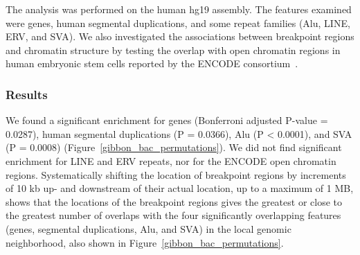 The analysis was performed on the human hg19 assembly. The features examined were genes, human segmental duplications, and some repeat families (Alu, LINE, ERV, and SVA). We also investigated the associations between breakpoint regions and chromatin structure by testing the overlap with open chromatin regions in human embryonic stem cells reported by the ENCODE consortium~\cite{ENCODEProjectConsortium:2011iz}. 

\subsubsection{Results}

We found a significant enrichment for genes (Bonferroni adjusted P-value = 0.0287), human segmental duplications (P = 0.0366), Alu (P < 0.0001), and SVA (P = 0.0008) (Figure~\ref{gibbon_bac_permutations}). We did not find significant enrichment for LINE and ERV repeats, nor for the ENCODE open chromatin regions. Systematically shifting the location of breakpoint regions by increments of 10 kb up- and downstream of their actual location, up to a maximum of 1 MB, shows that the locations of the breakpoint regions gives the greatest or close to the greatest number of overlaps with the four significantly overlapping features (genes, segmental duplications, Alu, and SVA) in the local genomic neighborhood, also shown in Figure~\ref{gibbon_bac_permutations}.

